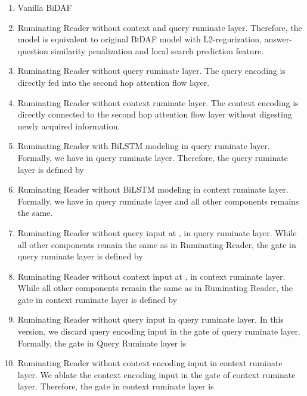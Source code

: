 \documentclass[11pt,letterpaper]{article}
\begin{document}
\begin{enumerate}
\item  Vanilla \textsc{BiDAF}
\item  Ruminating Reader without context and query ruminate layer. Therefore, the model is equivalent to original \textsc{BiDAF} model with L2-regurization, answer-question similarity penalization and local search prediction feature.
\item  Ruminating Reader without query ruminate layer. The query encoding  is directly fed into the second hop attention flow layer. 
\item  Ruminating Reader without context ruminate layer. The context encoding  is directly connected to the second hop attention flow layer without digesting newly acquired information. 

\item  Ruminating Reader with BiLSTM modeling in query ruminate layer. Formally, we have  in query ruminate layer. Therefore, the query ruminate layer is defined by




\item  Ruminating Reader without BiLSTM modeling in context ruminate layer. Formally, we have  in query ruminate layer and all other components remains the same.
\item  Ruminating Reader without query input at ,  in query ruminate layer. While all other components remain the same as in Ruminating Reader, the gate in query ruminate layer is defined by




\item Ruminating Reader without context input at  ,  in context ruminate layer. While all other components  remain the same as in Ruminating Reader, the gate in context ruminate layer is defined by




\item Ruminating Reader without query input in query ruminate layer. In this version, we discard query encoding input  in the gate of query ruminate layer. Formally, the gate in Query Ruminate layer is 





\item Ruminating Reader without context encoding input in context ruminate layer. We ablate the context encoding input  in the gate of context ruminate layer. Therefore, the gate in context ruminate layer is





\end{enumerate}
\end{document}
